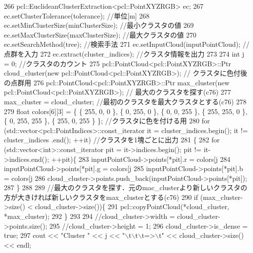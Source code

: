 \begin{DoxyCode}
266     pcl::EuclideanClusterExtraction<pcl::PointXYZRGB> ec;
267     ec.setClusterTolerance(tolerance); \textcolor{comment}{//単位[m]}
268     ec.setMinClusterSize(minClusterSize); \textcolor{comment}{//最小クラスタの値}
269     ec.setMaxClusterSize(maxClusterSize); \textcolor{comment}{//最大クラスタの値}
270     ec.setSearchMethod(tree); \textcolor{comment}{//検索手法}
271     ec.setInputCloud(inputPointCloud); \textcolor{comment}{//点群を入力}
272     ec.extract(cluster\_indices); \textcolor{comment}{//クラスタ情報を出力}
273 
274     \textcolor{keywordtype}{int} j = 0; \textcolor{comment}{//クラスタのカウント}
275     pcl::PointCloud<pcl::PointXYZRGB>::Ptr cloud\_cluster(\textcolor{keyword}{new} pcl::PointCloud<pcl::PointXYZRGB>); \textcolor{comment}{//
      クラスタに色付後の点群用}
276     pcl::PointCloud<pcl::PointXYZRGB>::Ptr max\_cluster(\textcolor{keyword}{new} pcl::PointCloud<pcl::PointXYZRGB>); \textcolor{comment}{//
      最大のクラスタを探す(c76)}
277     max\_cluster = cloud\_cluster; \textcolor{comment}{//最初のクラスタを最大クラスタとする(c76)}
278 
279     \textcolor{keywordtype}{float} colors[6][3] = \{ \{ 255, 0, 0 \}, \{ 0, 255, 0 \}, \{ 0, 0, 255 \}, \{ 255, 255, 0 \}, \{ 0, 255, 255 \}, \{
       255, 0, 255 \} \}; \textcolor{comment}{//クラスタに色を付ける用}
280     \textcolor{keywordflow}{for} (std::vector<pcl::PointIndices>::const\_iterator it = cluster\_indices.begin(); it != cluster\_indices
      .end(); ++it) \textcolor{comment}{//クラスタを1塊ごとに出力}
281     \{
282         \textcolor{keywordflow}{for} (std::vector<int>::const\_iterator pit = it->indices.begin(); pit != it->indices.end(); ++pit)\{
283             inputPointCloud->points[*pit].r = colors[j %
284             inputPointCloud->points[*pit].g = colors[j %
285             inputPointCloud->points[*pit].b = colors[j %
286             cloud\_cluster->points.push\_back(inputPointCloud->points[*pit]);
287         \}
288 
289         \textcolor{comment}{//最大のクラスタを探す．元のmac\_clusterより新しいクラスタの方が大きければ新しいクラスタをmax\_clusterとする(c76)}
290         \textcolor{keywordflow}{if} (max\_cluster->size() < cloud\_cluster->size())\{
291             pcl::copyPointCloud(*cloud\_cluster, *max\_cluster);
292         \}
293 
294         \textcolor{comment}{//cloud\_cluster->width = cloud\_cluster->points.size();}
295         \textcolor{comment}{//cloud\_cluster->height = 1;}
296         cloud\_cluster->is\_dense = \textcolor{keyword}{true};
297         cout << \textcolor{stringliteral}{"Cluster "} << j << \textcolor{stringliteral}{"\(\backslash\)t\(\backslash\)t\(\backslash\)t=>\(\backslash\)t"} << cloud\_cluster->size() << endl;

\end{DoxyCode}
